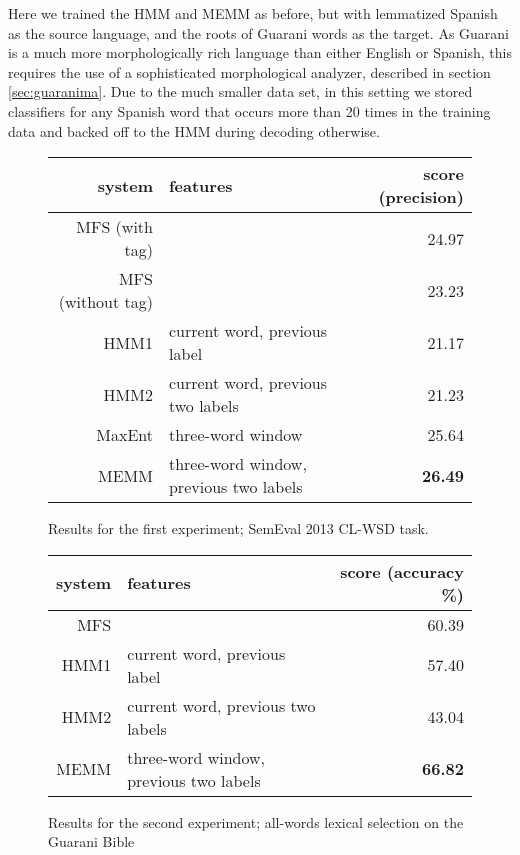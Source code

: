 Here we trained the HMM and MEMM as before, but with lemmatized Spanish as the
source language, and the roots of Guarani words as the target.  As Guarani is
a much more morphologically rich language than either English or Spanish, this
requires the use of a sophisticated morphological analyzer, described
in section \ref{sec:guaranima}. Due to the much smaller data set, in this
setting we stored classifiers for any Spanish word that occurs more than 20
times in the training data and backed off to the HMM during decoding otherwise.




\begin{figure*}[t!]
  \begin{center}
  \begin{tabular}{|r|l|r|}
    \hline
    system & features & score (precision) \\
    \hline
     MFS (with tag) &                                 & 24.97 \\
     MFS (without tag) &                              & 23.23 \\
    \hline
     HMM1    & current word, previous label           & 21.17 \\
     HMM2    & current word, previous two labels      & 21.23 \\
     MaxEnt  & three-word window                      & 25.64 \\
     MEMM    & three-word window, previous two labels & \textbf{26.49} \\
    \hline
  \end{tabular}
  \end{center}
\caption{Results for the first experiment; SemEval 2013 CL-WSD task.}
\label{fig:theresults}
\end{figure*}

\begin{figure*}[t!]
  \begin{center}
  \begin{tabular}{|r|l|r|}
    \hline
    system & features & score (accuracy \%) \\
    \hline
    MFS      &                                        & 60.39  \\
    \hline
     HMM1    & current word, previous label           & 57.40  \\
     HMM2    & current word, previous two labels      & 43.04  \\
     MEMM    & three-word window, previous two labels & \textbf{66.82}  \\
    \hline
  \end{tabular}
  \end{center}
\caption{Results for the second experiment; all-words lexical selection on the
Guarani Bible}
\label{fig:theresults2}
\end{figure*}

